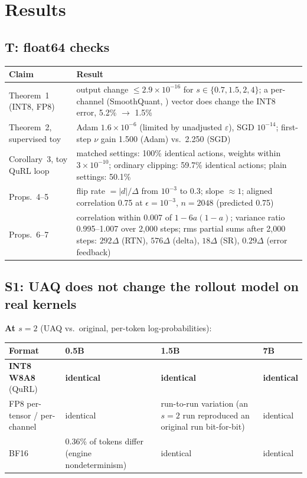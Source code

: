 \documentclass[11pt]{article}
\begin{document}
\section{Results}\label{sec:results}

\subsection{T: float64 checks}
\begin{center}\small
\begin{tabularx}{\linewidth}{@{}l L@{}}
\toprule
Claim & Result\\
\midrule
Theorem~1 (INT8, FP8) & output change $\le2.9\times10^{-16}$ for $s\in\{0.7,1.5,2,4\}$; a per-channel (SmoothQuant, \citealp{xiao2023smoothquant}) vector does change the INT8 error, 5.2\% $\to$ 1.5\%\\
Theorem~2, supervised toy & Adam $1.6\times10^{-6}$ (limited by unadjusted $\varepsilon$), SGD $10^{-14}$; first-step $\nu$ gain 1.500 (Adam) vs.\ 2.250 (SGD)\\
Corollary~3, toy QuRL loop & matched settings: 100\% identical actions, weights within $3\times10^{-10}$; ordinary clipping: 59.7\% identical actions; plain settings: 50.1\%\\
Props.~4--5 & flip rate $=|d|/\Delta$ from $10^{-3}$ to 0.3; slope $\approx1$; aligned correlation 0.75 at $\epsilon=10^{-3}$, $n=2048$ (predicted 0.75)\\
Props.~6--7 & correlation within 0.007 of $1-6a(1-a)$; variance ratio 0.995--1.007 over 2{,}000 steps; rms partial sums after 2{,}000 steps: $292\Delta$ (RTN), $576\Delta$ (delta), $18\Delta$ (SR), $0.29\Delta$ (error feedback)\\
\bottomrule
\end{tabularx}
\end{center}

\subsection{S1: UAQ does not change the rollout model on real kernels}\label{sec:s1-results}
\textbf{At $s=2$} (UAQ vs.\ original, per-token log-probabilities):
\begin{center}\small
\begin{tabularx}{\linewidth}{@{}l L L l@{}}
\toprule
Format & 0.5B & 1.5B & 7B\\
\midrule
\textbf{INT8 W8A8} (QuRL) & \textbf{identical} & \textbf{identical} & \textbf{identical}\\
FP8 per-tensor / per-channel & identical & run-to-run variation (an $s=2$ run reproduced an original run bit-for-bit) & identical\\
BF16 & 0.36\% of tokens differ (engine nondeterminism) & identical & identical\\
\bottomrule
\end{tabularx}
\end{center}
\end{document}
